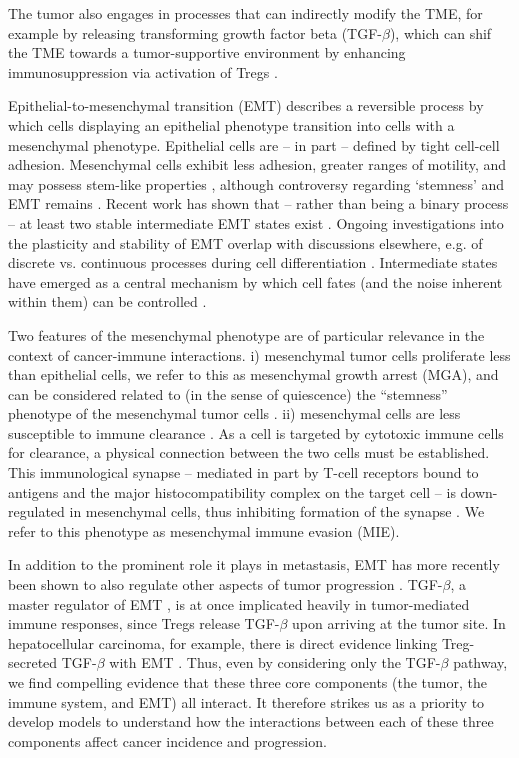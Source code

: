 \documentclass[11pt]{article}
\begin{document}
The tumor also engages in processes that can indirectly modify the TME, for example by releasing transforming growth factor beta (TGF-$\beta$), which can shif the TME towards a tumor-supportive environment by enhancing immunosuppression via activation of Tregs \cite{schreiber11_cancer}.
\par
Epithelial-to-mesenchymal transition (EMT) describes a reversible process by which cells displaying an epithelial phenotype transition into cells with a mesenchymal phenotype.
Epithelial cells are -- in part -- defined by tight cell-cell adhesion. Mesenchymal cells exhibit less adhesion, greater ranges of motility, and may possess stem-like properties \cite{nieto2016emt}, although controversy regarding `stemness' and EMT remains \cite{nie18_stem, sha19_intermediate}.  
Recent work has shown that -- rather than being a binary process -- at least two stable intermediate EMT states exist \cite{hong2015ovol2, jolly15_coupling}.
Ongoing investigations into the plasticity and stability of EMT overlap with discussions elsewhere, e.g. of discrete vs. continuous processes during cell differentiation \cite{moris16_transition}.
Intermediate states have emerged as a central mechanism by which cell fates (and the noise inherent within them) can be controlled \cite{maclean18_exploring, ta16_controlling, rackauckas18_meanindependent}. 
\par 
Two features of the mesenchymal phenotype are of particular relevance in the context of cancer-immune interactions. i) mesenchymal tumor cells proliferate less than epithelial cells, we refer to this as mesenchymal growth arrest (MGA), and can be considered related to (in the sense of quiescence) the ``stemness'' phenotype of the mesenchymal tumor cells \cite{woods2014effects}. ii) mesenchymal cells are less susceptible to immune clearance \cite{terry2017new}. As a cell is targeted by cytotoxic immune cells for clearance, a physical connection between the two cells must be established. This immunological synapse -- mediated in part by T-cell receptors bound to antigens and the major histocompatibility complex on the target cell -- is down-regulated in mesenchymal cells, thus inhibiting formation of the synapse \cite{terry2017new}. We refer to this phenotype as mesenchymal immune evasion (MIE).
\par
In addition to the prominent role it plays in metastasis, EMT has more recently been shown to also regulate other aspects of tumor progression \cite{nieto2016emt,peinado2007snail}.
TGF-$\beta$, a master regulator of EMT \cite{lim2012epithelial}, is at once implicated heavily in tumor-mediated immune responses, since Tregs release TGF-$\beta$ upon arriving at the tumor site\cite{terry2017new}. In hepatocellular carcinoma, for example, there is direct evidence linking Treg-secreted TGF-$\beta$ with EMT \cite{shi2019cd4+}. Thus, even by considering only the TGF-$\beta$ pathway, we find compelling evidence that  these three core components (the tumor, the immune system, and EMT) all interact. It therefore strikes us as a priority to develop models to understand how the interactions between each of these three components affect cancer incidence and progression.
\end{document}
